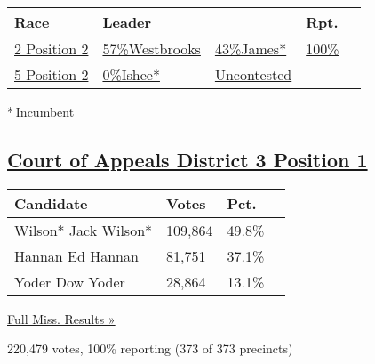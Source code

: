 \begin{longtable}[]{@{}lllll@{}}
\toprule
Race & Leader & & Rpt. &\tabularnewline
\midrule
\endhead
\href{//www.nytimes3xbfgragh.onion/elections/2016/results/mississippi-appeals-court-district-2-position-2}{2
Position 2} &
\href{//www.nytimes3xbfgragh.onion/elections/2016/results/mississippi-appeals-court-district-2-position-2}{
57\%Westbrooks} &
\href{//www.nytimes3xbfgragh.onion/elections/2016/results/mississippi-appeals-court-district-2-position-2}{
43\%James*} &
\href{//www.nytimes3xbfgragh.onion/elections/2016/results/mississippi-appeals-court-district-2-position-2}{100\%}
&
\href{//www.nytimes3xbfgragh.onion/elections/2016/results/mississippi-appeals-court-district-2-position-2}{}\tabularnewline
\href{//www.nytimes3xbfgragh.onion/elections/2016/results/mississippi-appeals-court-district-5-position-2}{5
Position 2} &
\href{//www.nytimes3xbfgragh.onion/elections/2016/results/mississippi-appeals-court-district-5-position-2}{
0\%Ishee*} &
\href{//www.nytimes3xbfgragh.onion/elections/2016/results/mississippi-appeals-court-district-5-position-2}{Uncontested}
&
\href{//www.nytimes3xbfgragh.onion/elections/2016/results/mississippi-appeals-court-district-5-position-2}{}
&
\href{//www.nytimes3xbfgragh.onion/elections/2016/results/mississippi-appeals-court-district-5-position-2}{}\tabularnewline
\bottomrule
\end{longtable}

* Incumbent~

\hypertarget{court-of-appeals-district-3-position-1}{%
\subsection{\texorpdfstring{\href{https://www.nytimes3xbfgragh.onion/elections/2016/results/mississippi-court-of-appeals-district-3-position-1}{Court
of Appeals District 3 Position
1}}{Court of Appeals District 3 Position 1}}\label{court-of-appeals-district-3-position-1}}

\begin{longtable}[]{@{}llll@{}}
\toprule
Candidate & Votes & Pct. &\tabularnewline
\midrule
\endhead
 Wilson* Jack Wilson* & 109,864 & 49.8\% &\tabularnewline
 Hannan Ed Hannan & 81,751 & 37.1\% &\tabularnewline
 Yoder Dow Yoder & 28,864 & 13.1\% &\tabularnewline
\bottomrule
\end{longtable}

\href{https://www.nytimes3xbfgragh.onion/elections/2016/results/mississippi}{Full
Miss. Results »}

220,479 votes, 100\% reporting (373 of 373 precincts)

